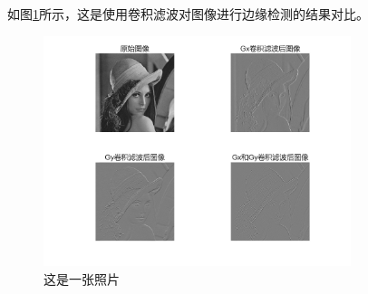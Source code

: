 \documentclass{cquptformat}
\begin{document}
如图\ref{fig:lenna}所示，这是使用卷积滤波对图像进行边缘检测的结果对比。

\begin{figure}[H]
	\centering
	\includegraphics[width=0.8\textwidth]{figures/lenna.png}
	\caption{这是一张照片}
	\label{fig:lenna}
\end{figure}
\end{document}
